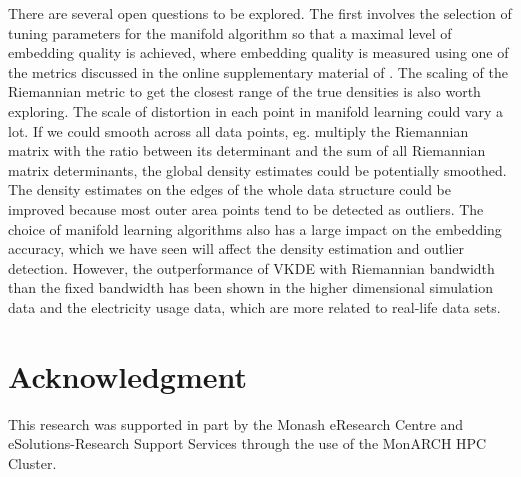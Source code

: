 \documentclass[11pt,a4paper,]{article}
\begin{document}
There are several open questions to be explored. The first involves the selection of tuning parameters for the manifold algorithm so that a maximal level of embedding quality is achieved, where embedding quality is measured using one of the metrics discussed in the online supplementary material of \textcite{Cheng2021-ex}. The scaling of the Riemannian metric to get the closest range of the true densities is also worth exploring. The scale of distortion in each point in manifold learning could vary a lot. If we could smooth across all data points, eg. multiply the Riemannian matrix with the ratio between its determinant and the sum of all Riemannian matrix determinants, the global density estimates could be potentially smoothed. The density estimates on the edges of the whole data structure could be improved because most outer area points tend to be detected as outliers. The choice of manifold learning algorithms also has a large impact on the embedding accuracy, which we have seen will affect the density estimation and outlier detection. However, the outperformance of VKDE with Riemannian bandwidth than the fixed bandwidth has been shown in the higher dimensional simulation data and the electricity usage data, which are more related to real-life data sets.

\hypertarget{acknowledgment}{%
\section*{Acknowledgment}\label{acknowledgment}}

This research was supported in part by the Monash eResearch Centre and eSolutions-Research Support Services through the use of the MonARCH HPC Cluster.

\newpage

\printbibliography
\end{document}
